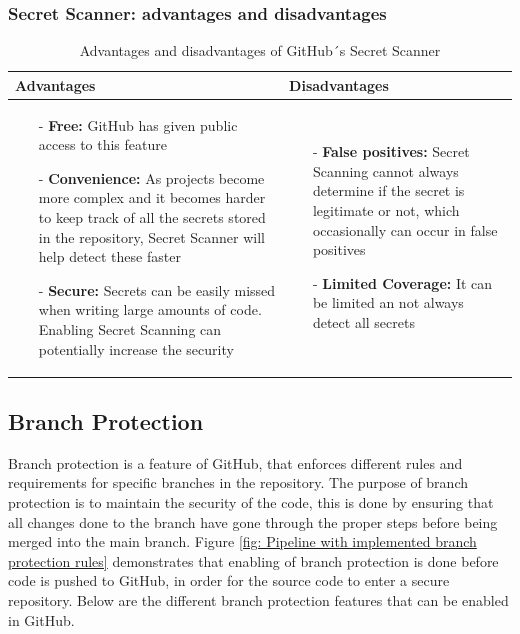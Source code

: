 \subsubsection{Secret Scanner: advantages and disadvantages}
\begin{table}[H]
\centering
\begin{tabular}{|>{\raggedright\arraybackslash}p{6cm}|>{\raggedright\arraybackslash}p{6cm}|}
\hline
\textbf{Advantages} & \textbf{Disadvantages} \\
\hline
\begin{itemize}
\item [-] \textbf{Free:} GitHub has given public access to this feature 
\item [-]\textbf{Convenience:} As projects become more complex and it becomes harder to keep track of all the secrets stored in the repository, Secret Scanner will help detect these faster 
\item [-] \textbf{Secure:} Secrets can be easily missed when writing large amounts of code. Enabling Secret Scanning can potentially increase the security 
\end{itemize}
&
   \begin{itemize}
\item [-] \textbf{False positives:} Secret Scanning cannot always determine if the secret is legitimate or not, which occasionally can occur in false positives
\item [-] \textbf{Limited Coverage:} It can be limited an not always detect all secrets
    \end{itemize}
    \\
    \hline
    \end{tabular}
    \caption{Advantages and disadvantages of GitHub´s Secret Scanner}\cite{Secret_Scanner_pros_cons}
    \label{tab: Secret_Scanner}
    \end{table}
    

\subsection{Branch Protection}
\label{branchprotection}
Branch protection is a feature of GitHub, that enforces different rules and requirements for specific branches in the repository. The purpose of branch protection is to maintain the security of the code, this is done by ensuring that all changes done to the branch have gone through the proper steps before being merged into the main branch. Figure \ref{fig: Pipeline with implemented branch protection rules} demonstrates that enabling of branch protection is done before code is pushed to GitHub, in order for the source code to enter a secure repository. Below are the different branch protection features that can be enabled in GitHub. \cite{ProtectedBranches}

